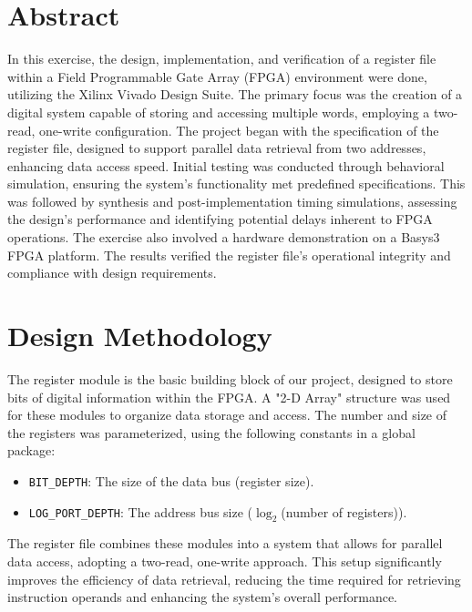 \documentclass[CMPE]{../KGCOEReport}
\begin{document}
\maketitle

\section*{Abstract}

In this exercise, the design, implementation, and verification of a register file within a Field Programmable Gate Array (FPGA) environment were done, utilizing the Xilinx Vivado Design Suite. The primary focus was the creation of a digital system capable of storing and accessing multiple words, employing a two-read, one-write configuration. The project began with the specification of the register file, designed to support parallel data retrieval from two addresses, enhancing data access speed. Initial testing was conducted through behavioral simulation, ensuring the system's functionality met predefined specifications. This was followed by synthesis and post-implementation timing simulations, assessing the design's performance and identifying potential delays inherent to FPGA operations. The exercise also involved a hardware demonstration on a Basys3 FPGA platform. The results verified the register file's operational integrity and compliance with design requirements.

\section*{Design Methodology}

The register module is the basic building block of our project, designed to store bits of digital information within the FPGA. A "2-D Array" structure was used for these modules to organize data storage and access.
The number and size of the registers was parameterized, using the following constants in a global package:

\begin{itemize}
    \item \verb|BIT_DEPTH|: The size of the data bus (register size).
    \item \verb|LOG_PORT_DEPTH|: The address bus size (\(\log_2\)(number of registers)).
\end{itemize}

The register file combines these modules into a system that allows for parallel data access, adopting a two-read, one-write approach. This setup significantly improves the efficiency of data retrieval, reducing the time required for retrieving instruction operands and enhancing the system's overall performance.
\end{document}
